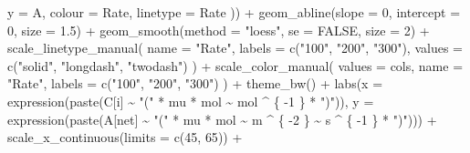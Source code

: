 \documentclass[
]{krantz}
\makeatletter
\newenvironment{Shaded}{\begin{snugshade}}{\end{snugshade}}
\newcommand{\AttributeTok}[1]{\textcolor[rgb]{0.77,0.63,0.00}{#1}}
\newcommand{\ConstantTok}[1]{\textcolor[rgb]{0.00,0.00,0.00}{#1}}
\newcommand{\DecValTok}[1]{\textcolor[rgb]{0.00,0.00,0.81}{#1}}
\newcommand{\FloatTok}[1]{\textcolor[rgb]{0.00,0.00,0.81}{#1}}
\newcommand{\FunctionTok}[1]{\textcolor[rgb]{0.00,0.00,0.00}{#1}}
\newcommand{\NormalTok}[1]{#1}
\newcommand{\SpecialCharTok}[1]{\textcolor[rgb]{0.00,0.00,0.00}{#1}}
\newcommand{\StringTok}[1]{\textcolor[rgb]{0.31,0.60,0.02}{#1}}
\newenvironment{kframe}{%
\medskip{}
\setlength{\fboxsep}{.8em}
 \def\at@end@of@kframe{}%
 \ifinner\ifhmode%
  \def\at@end@of@kframe{\end{minipage}}%
  \begin{minipage}{\columnwidth}%
 \fi\fi%
 \def\FrameCommand##1{\hskip\@totalleftmargin \hskip-\fboxsep
 \colorbox{shadecolor}{##1}\hskip-\fboxsep
     \hskip-\linewidth \hskip-\@totalleftmargin \hskip\columnwidth}%
 \MakeFramed {\advance\hsize-\width
   \@totalleftmargin\z@ \linewidth\hsize
   \@setminipage}}%
 {\par\unskip\endMakeFramed%
 \at@end@of@kframe}
\renewenvironment{Shaded}{\begin{kframe}}{\end{kframe}}
\makeatother
\begin{document}
\begin{Shaded}
\begin{Highlighting}[]
    \AttributeTok{y =}\NormalTok{ A,}
    \AttributeTok{colour =}\NormalTok{ Rate,}
    \AttributeTok{linetype =}\NormalTok{ Rate}
\NormalTok{  )) }\SpecialCharTok{+}
  \FunctionTok{geom\_abline}\NormalTok{(}\AttributeTok{slope =} \DecValTok{0}\NormalTok{,}
              \AttributeTok{intercept =} \DecValTok{0}\NormalTok{,}
              \AttributeTok{size =} \FloatTok{1.5}\NormalTok{) }\SpecialCharTok{+}
  \FunctionTok{geom\_smooth}\NormalTok{(}\AttributeTok{method =} \StringTok{"loess"}\NormalTok{, }\AttributeTok{se =} \ConstantTok{FALSE}\NormalTok{, }\AttributeTok{size =} \DecValTok{2}\NormalTok{) }\SpecialCharTok{+}
  \FunctionTok{scale\_linetype\_manual}\NormalTok{(}
    \AttributeTok{name =} \StringTok{"Rate"}\NormalTok{,}
    \AttributeTok{labels =} \FunctionTok{c}\NormalTok{(}\StringTok{"100"}\NormalTok{, }\StringTok{"200"}\NormalTok{, }\StringTok{"300"}\NormalTok{),}
    \AttributeTok{values =} \FunctionTok{c}\NormalTok{(}\StringTok{"solid"}\NormalTok{, }\StringTok{"longdash"}\NormalTok{, }\StringTok{"twodash"}\NormalTok{)}
\NormalTok{  ) }\SpecialCharTok{+}
  \FunctionTok{scale\_color\_manual}\NormalTok{(}
    \AttributeTok{values =}\NormalTok{ cols,}
    \AttributeTok{name =} \StringTok{"Rate"}\NormalTok{,}
    \AttributeTok{labels =} \FunctionTok{c}\NormalTok{(}\StringTok{"100"}\NormalTok{, }\StringTok{"200"}\NormalTok{, }\StringTok{"300"}\NormalTok{)}
\NormalTok{  ) }\SpecialCharTok{+}
  \FunctionTok{theme\_bw}\NormalTok{() }\SpecialCharTok{+}
  \FunctionTok{labs}\NormalTok{(}\AttributeTok{x =} \FunctionTok{expression}\NormalTok{(}\FunctionTok{paste}\NormalTok{(C[i] }\SpecialCharTok{\textasciitilde{}} \StringTok{"("} \SpecialCharTok{*}\NormalTok{ mu }\SpecialCharTok{*}\NormalTok{ mol }\SpecialCharTok{\textasciitilde{}}\NormalTok{ mol }\SpecialCharTok{\^{}}\NormalTok{ \{}
    \SpecialCharTok{{-}}\DecValTok{1}
\NormalTok{  \} }\SpecialCharTok{*} \StringTok{")"}\NormalTok{)), }\AttributeTok{y =} \FunctionTok{expression}\NormalTok{(}\FunctionTok{paste}\NormalTok{(A[net] }\SpecialCharTok{\textasciitilde{}} \StringTok{"("} \SpecialCharTok{*}\NormalTok{ mu }\SpecialCharTok{*}\NormalTok{ mol }\SpecialCharTok{\textasciitilde{}}\NormalTok{ m }\SpecialCharTok{\^{}}\NormalTok{ \{}
    \SpecialCharTok{{-}}\DecValTok{2}
\NormalTok{  \} }\SpecialCharTok{\textasciitilde{}}\NormalTok{ s }\SpecialCharTok{\^{}}\NormalTok{ \{}
    \SpecialCharTok{{-}}\DecValTok{1}
\NormalTok{  \} }\SpecialCharTok{*} \StringTok{")"}\NormalTok{))) }\SpecialCharTok{+}
  \FunctionTok{scale\_x\_continuous}\NormalTok{(}\AttributeTok{limits =} \FunctionTok{c}\NormalTok{(}\DecValTok{45}\NormalTok{, }\DecValTok{65}\NormalTok{)) }\SpecialCharTok{+}

\end{Highlighting}
\end{Shaded}
\end{document}
